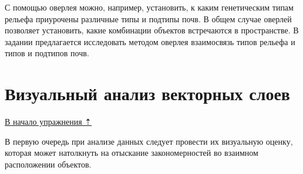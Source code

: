 \documentclass[
  12pt,
]{book}
\begin{document}
С помощью оверлея можно, например, установить, к каким генетическим типам рельефа приурочены различные типы и подтипы почв. В общем случае оверлей позволяет установить, какие комбинации объектов встречаются в пространстве. В задании предлагается исследовать методом оверлея взаимосвязь типов рельефа и типов и подтипов почв.

\hypertarget{overlay-vectors}{%
\section{Визуальный анализ векторных слоев}\label{overlay-vectors}}

\protect\hyperlink{overlay}{В начало упражнения ⇡}

В первую очередь при анализе данных следует провести их визуальную оценку, которая может натолкнуть на отыскание закономерностей во взаимном расположении объектов.
\end{document}
